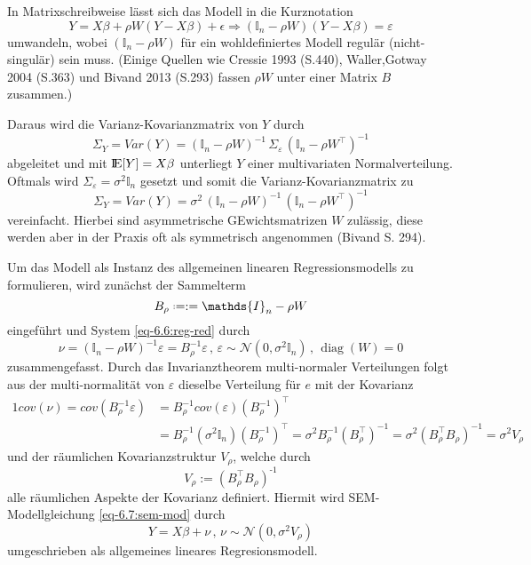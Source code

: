 In Matrixschreibweise lässt sich das Modell in die Kurznotation
\begin{equation*}
    Y=X \beta + \rho W (Y-X \beta) + \epsilon  \Rightarrow  (\mathds{I}_{n}-\rho W) (Y-X \beta) = \varepsilon
\end{equation*}
umwandeln, wobei $(\mathds{I}_{n}-\rho W)$ für ein wohldefiniertes Modell regulär (nicht-singulär) sein muss.
(Einige Quellen wie Cressie 1993 (S.440), Waller,Gotway 2004 (S.363) und Bivand 2013 (S.293) fassen $\rho W$ unter einer Matrix $B$ zusammen.)

Daraus wird die Varianz-Kovarianzmatrix von $Y$ durch
\begin{equation*}
    \Sigma_{Y}=Var(Y) = (\mathds{I}_{n}-\rho W)^{-1} \, \Sigma_{\varepsilon} \, (\mathds{I}_{n}-\rho W^{\top})^{-1}
\end{equation*}
abgeleitet und mit ${\rm I\!E}[Y]=X \beta$ unterliegt $Y$ einer multivariaten Normalverteilung. 
Oftmals wird $\Sigma_{\varepsilon}=\sigma^{2} \mathds{I}_{n}$ gesetzt und somit die Varianz-Kovarianzmatrix zu
\begin{equation*}
    \Sigma_{Y}=Var(Y) = \sigma^{2} \, (\mathds{I}_{n}-\rho W)^{-1} \, (\mathds{I}_{n}-\rho W^{\top})^{-1}
\end{equation*}
vereinfacht. Hierbei sind asymmetrische GEwichtsmatrizen $W$ zulässig, diese werden aber in der Praxis 
oft als symmetrisch angenommen (Bivand S. 294).

Um das Modell als Instanz des allgemeinen linearen Regressionsmodells zu formulieren,
wird zunächst der Sammelterm
\begin{equation}
    B_{\rho} \defeq := \mathds{I}_{n} - \rho W
\end{equation}
eingeführt und System \eqref{eq-6.6:reg-red} durch
\begin{equation}
    \nu=(\mathds{I}_{n} -\rho W)^{-1} \varepsilon=B_{\rho}^{-1} \varepsilon \, , \, 
    \varepsilon \sim \mathcal{N}(0,\sigma^{2} \mathds{I}_{n}) \, , \, \operatorname{diag}(W)=0    
\end{equation}
zusammengefasst.
Durch das Invarianztheorem multi-normaler Verteilungen folgt aus der 
multi-normalität von $\varepsilon$ dieselbe Verteilung für $e$ mit der Kovarianz
\begin{alignat*}{1}
    cov(\nu)=cov(B_{\rho}^{-1} \varepsilon) 
    & = B_{\rho}^{-1} cov(\varepsilon) (B_{\rho}^{-1})^{\top} \\
    & = B_{\rho}^{-1} (\sigma^{2} \mathds{I}_{n}) (B_{\rho}^{-1})^{\top}=
    \sigma^{2} B_{\rho}^{-1} (B_{\rho}^{\top})^{-1}=
    \sigma^{2} (B_{\rho}^{\top} B_{\rho})^{-1} =\sigma^{2} V_{\rho}
\end{alignat*}
und der räumlichen Kovarianzstruktur $V_{\rho}$, welche durch
\begin{equation}
    V_{\rho} := (B_{\rho}^{\top} B_{\rho})^{\text{-1}}
\end{equation}
alle räumlichen Aspekte der Kovarianz definiert. Hiermit wird 
SEM-Modellgleichung \eqref{eq-6.7:sem-mod} durch 
\begin{equation} \label{eq-6.8:sem-mod2}
    Y=X \beta + \nu \, , \, 
    \nu \sim \mathcal{N}(0,\sigma^{2} {V}_{\rho})
\end{equation}
umgeschrieben als allgemeines lineares Regresionsmodell.

